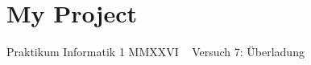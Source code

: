 \chapter{My Project}
\hypertarget{index}{}\label{index}
Praktikum Informatik 1 MMXXVI ~\newline
 Versuch 7\+: Überladung 